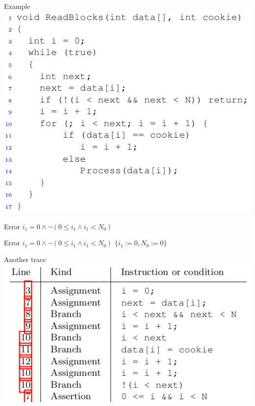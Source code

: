 \documentclass{beamer}
\begin{document}
\begin{frame}{Example}
\includegraphics[scale=0.5]{example1.png}
\end{frame}

\begin{frame}{Error}
$i_1 = 0 \wedge \lnot (0 \le i_1 \wedge i_1 < N_0)$\newline
\end{frame}

\begin{frame}{Error}
$i_1 = 0 \wedge \lnot (0 \le i_1 \wedge i_1 < N_0)$\newline
$\{i_1 := 0, N_0 := 0\}$
\end{frame}

\begin{frame}{Another trace}
\includegraphics[scale=0.5]{trace2.png}
\end{frame}
\end{document}
